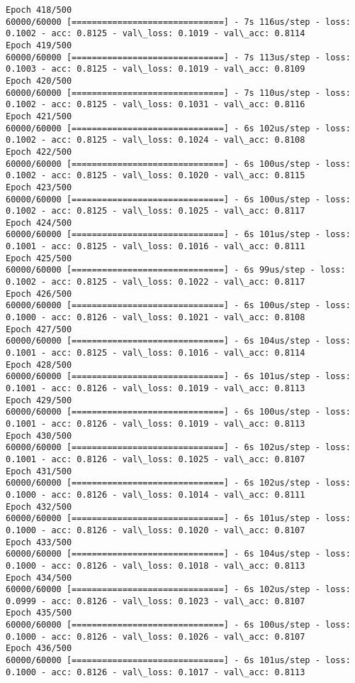 \documentclass[11pt]{article}
\begin{document}
\begin{Verbatim}[commandchars=\\\{\}]
Epoch 418/500
60000/60000 [==============================] - 7s 116us/step - loss: 0.1002 - acc: 0.8125 - val\_loss: 0.1019 - val\_acc: 0.8114
Epoch 419/500
60000/60000 [==============================] - 7s 113us/step - loss: 0.1003 - acc: 0.8125 - val\_loss: 0.1019 - val\_acc: 0.8109
Epoch 420/500
60000/60000 [==============================] - 7s 110us/step - loss: 0.1002 - acc: 0.8125 - val\_loss: 0.1031 - val\_acc: 0.8116
Epoch 421/500
60000/60000 [==============================] - 6s 102us/step - loss: 0.1002 - acc: 0.8125 - val\_loss: 0.1024 - val\_acc: 0.8108
Epoch 422/500
60000/60000 [==============================] - 6s 100us/step - loss: 0.1002 - acc: 0.8125 - val\_loss: 0.1020 - val\_acc: 0.8115
Epoch 423/500
60000/60000 [==============================] - 6s 100us/step - loss: 0.1002 - acc: 0.8125 - val\_loss: 0.1025 - val\_acc: 0.8117
Epoch 424/500
60000/60000 [==============================] - 6s 101us/step - loss: 0.1001 - acc: 0.8125 - val\_loss: 0.1016 - val\_acc: 0.8111
Epoch 425/500
60000/60000 [==============================] - 6s 99us/step - loss: 0.1002 - acc: 0.8125 - val\_loss: 0.1022 - val\_acc: 0.8117
Epoch 426/500
60000/60000 [==============================] - 6s 100us/step - loss: 0.1000 - acc: 0.8126 - val\_loss: 0.1021 - val\_acc: 0.8108
Epoch 427/500
60000/60000 [==============================] - 6s 104us/step - loss: 0.1001 - acc: 0.8125 - val\_loss: 0.1016 - val\_acc: 0.8114
Epoch 428/500
60000/60000 [==============================] - 6s 101us/step - loss: 0.1001 - acc: 0.8126 - val\_loss: 0.1019 - val\_acc: 0.8113
Epoch 429/500
60000/60000 [==============================] - 6s 100us/step - loss: 0.1001 - acc: 0.8126 - val\_loss: 0.1019 - val\_acc: 0.8113
Epoch 430/500
60000/60000 [==============================] - 6s 102us/step - loss: 0.1001 - acc: 0.8126 - val\_loss: 0.1025 - val\_acc: 0.8107
Epoch 431/500
60000/60000 [==============================] - 6s 102us/step - loss: 0.1000 - acc: 0.8126 - val\_loss: 0.1014 - val\_acc: 0.8111
Epoch 432/500
60000/60000 [==============================] - 6s 101us/step - loss: 0.1000 - acc: 0.8126 - val\_loss: 0.1020 - val\_acc: 0.8107
Epoch 433/500
60000/60000 [==============================] - 6s 104us/step - loss: 0.1000 - acc: 0.8126 - val\_loss: 0.1018 - val\_acc: 0.8113
Epoch 434/500
60000/60000 [==============================] - 6s 102us/step - loss: 0.0999 - acc: 0.8126 - val\_loss: 0.1023 - val\_acc: 0.8107
Epoch 435/500
60000/60000 [==============================] - 6s 100us/step - loss: 0.1000 - acc: 0.8126 - val\_loss: 0.1026 - val\_acc: 0.8107
Epoch 436/500
60000/60000 [==============================] - 6s 101us/step - loss: 0.1000 - acc: 0.8126 - val\_loss: 0.1017 - val\_acc: 0.8113

\end{Verbatim}
\end{document}
